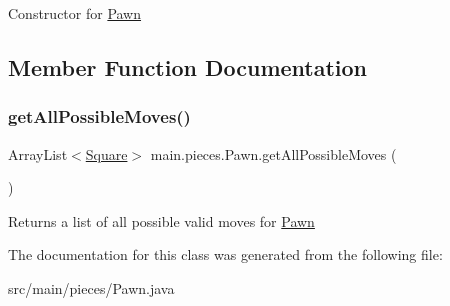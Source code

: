 Constructor for \hyperlink{classmain_1_1pieces_1_1_pawn}{Pawn} 

\subsection{Member Function Documentation}
\mbox{\label{classmain_1_1pieces_1_1_pawn_af772977e7eb1cc1b463531db4c3627aa}} 
\subsubsection{\texorpdfstring{get\+All\+Possible\+Moves()}{getAllPossibleMoves()}}
{\footnotesize\ttfamily Array\+List$<$\hyperlink{classmain_1_1_square}{Square}$>$ main.\+pieces.\+Pawn.\+get\+All\+Possible\+Moves (\begin{DoxyParamCaption}{ }\end{DoxyParamCaption})\hspace{0.3cm}{\ttfamily [inline]}}

Returns a list of all possible valid moves for \hyperlink{classmain_1_1pieces_1_1_pawn}{Pawn} 

The documentation for this class was generated from the following file\+:\begin{DoxyCompactItemize}
\item 
src/main/pieces/Pawn.\+java\end{DoxyCompactItemize}
